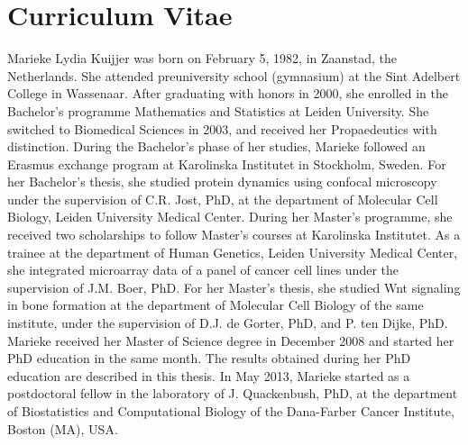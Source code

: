 \chapter{Curriculum Vitae}
\thispagestyle{empty}				%
Marieke Lydia Kuijjer was born on February 5, 1982, in Zaanstad, the Netherlands. She attended preuniversity school (gymnasium) at the Sint Adelbert College in Wassenaar. After graduating with honors in 2000, she enrolled in the Bachelor's programme Mathematics and Statistics at Leiden University. She switched to Biomedical Sciences in 2003, and received her Propaedeutics with distinction. During the Bachelor's phase of her studies, Marieke followed an Erasmus exchange program at Karolinska Institutet in Stockholm, Sweden. For her Bachelor's thesis, she studied protein dynamics using confocal microscopy under the supervision of C.R. Jost, PhD, at the department of Molecular Cell Biology, Leiden University Medical Center. During her Master's programme, she received two scholarships to follow Master's courses at Karolinska Institutet. As a trainee at the department of Human Genetics, Leiden University Medical Center, she integrated microarray data of a panel of cancer cell lines under the supervision of J.M. Boer, PhD. For her Master's thesis, she studied Wnt signaling in bone formation at the department of Molecular Cell Biology of the same institute, under the supervision of D.J. de Gorter, PhD, and P. ten Dijke, PhD. Marieke received her Master of Science degree in December 2008 and started her PhD education in the same month. The results obtained during her PhD education are described in this thesis. In May 2013, Marieke started as a postdoctoral fellow in the laboratory of J. Quackenbush, PhD, at the department of Biostatistics and Computational Biology of the Dana-Farber Cancer Institute, Boston (MA), USA.
\newpage
%
%
\renewcommand{\chaptername}{}		%
\renewcommand{\thechapter}{}			%
